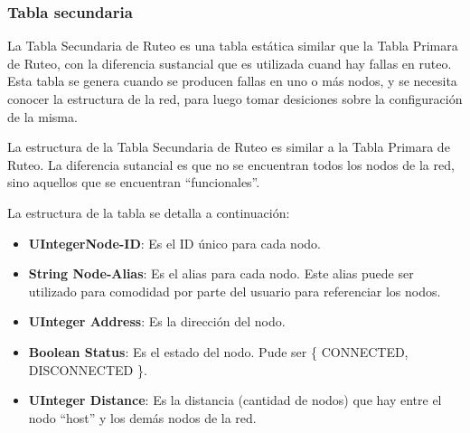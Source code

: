 \subsubsection{Tabla secundaria}
La Tabla Secundaria de Ruteo es una tabla estática similar que la Tabla Primara
de Ruteo, con la diferencia sustancial que es utilizada cuand hay fallas en
ruteo. Esta tabla se genera cuando se producen fallas en uno o más nodos, y se
necesita conocer la estructura de la red, para luego tomar desiciones sobre la
configuración de la misma.

La estructura de la Tabla Secundaria de Ruteo es similar a la Tabla Primara de
Ruteo. La diferencia sutancial es que no se encuentran todos los nodos de la
red, sino aquellos que se encuentran ``funcionales''.

La estructura de la tabla se detalla a continuación:
\begin{itemize}
\item \textbf{UIntegerNode-ID}: Es el ID único para cada nodo. 
\item \textbf{String Node-Alias}: Es el alias para cada nodo. Este alias puede
  ser utilizado para comodidad por parte del usuario para referenciar los nodos.
\item \textbf{UInteger Address}: Es la dirección del nodo.
\item \textbf{Boolean Status}: Es el estado del nodo. Pude ser \{ CONNECTED,
  DISCONNECTED \}.
\item \textbf{UInteger Distance}: Es la distancia (cantidad de nodos) que hay
  entre el nodo  ``host'' y los demás nodos de la red. 
\end{itemize}

